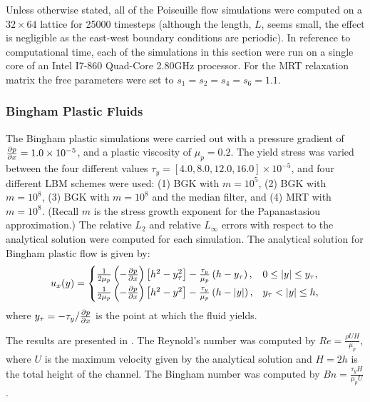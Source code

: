 \documentclass[pdftex,ms]{pittetd}
\begin{document}
Unless otherwise stated, all of the Poiseuille flow simulations were computed on a $32 \times 64$ lattice for 25000 timesteps (although the length, $L$, seems small, the effect is negligible as the east-west boundary conditions are periodic).
In reference to computational time, each of the simulations in this section were run on a single core of an Intel I7-860 Quad-Core 2.80GHz processor.
For the MRT relaxation matrix the free parameters were set to $s_1 = s_2 = s_4 = s_6 = 1.1$.

\subsubsection{Bingham Plastic Fluids} \label{sec:poise-bing}

The Bingham plastic simulations were carried out with a pressure gradient of $\frac{\partial p}{\partial x} = 1.0 \times 10^{-5}$, and a plastic viscosity of $\mu_p = 0.2$.
The yield stress was varied between the four different values $\tau_y = [4.0, 8.0, 12.0, 16.0] \times 10^{-5}$, and four different LBM schemes were used: (1) BGK with $m = 10^5$, (2) BGK with $m = 10^8$, (3) BGK with $m = 10^8$ and the median filter, and (4) MRT with $m = 10^8$. 
(Recall $m$ is the stress growth exponent for the Papanastasiou approximation.)
The relative $L_2$ and relative $L_{\infty}$ errors with respect to the analytical solution were computed for each simulation.
The analytical solution for Bingham plastic flow is given by:
\begin{equation} \label{eq:analytical-bingham}
u_x(y) = \begin{cases}
\frac{1}{2 \mu_p} \left(-\frac{\partial p}{\partial x}\right) \left[h^2 - y_{\tau}^2 \right] - \frac{\tau_y}{\mu_p} \left(h - y_{\tau}\right), & 0 \leq |y| \leq y_{\tau}, \\
\frac{1}{2 \mu_p} \left(-\frac{\partial p}{\partial x}\right) \left[h^2 - y^2 \right] - \frac{\tau_y}{\mu_p} \left(h - |y|\right), & y_{\tau} < |y| \leq h,
\end{cases}
\end{equation}
\noindent where $y_{\tau} = -\tau_y / \frac{\partial p}{\partial x}$ is the point at which the fluid yields.

The results are presented in .
The Reynold's number was computed by $Re = \frac{\rho U H}{\mu_p}$, where $U$ is the maximum velocity given by the analytical solution and $H = 2h$ is the total height of the channel.
The Bingham number was computed by $Bn = \frac{\tau_y H}{\mu_p U}$.

\end{document}
